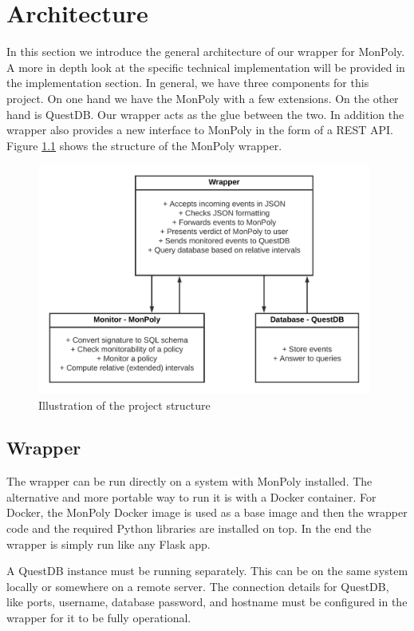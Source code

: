 \chapter{Architecture}

In this section we introduce the general architecture of our wrapper for MonPoly.
A more in depth look at the specific technical implementation will be provided in the implementation section.
In general, we have three components for this project.
On one hand we have the MonPoly with a few extensions.
On the other hand is QuestDB.
Our wrapper acts as the glue between the two.
In addition the wrapper also provides a new interface to MonPoly in the form of a REST API.
Figure \ref{fig:wrapper} shows the structure of the MonPoly wrapper.

\begin{figure}
  \centering
  \includegraphics[width=110mm]{diagrams/wrapper.png}
  \caption{Illustration of the project structure}
  \label{fig:wrapper}
\end{figure}


\section{Wrapper}

The wrapper can be run directly on a system with MonPoly installed.
The alternative and more portable way to run it is with a Docker container.
For Docker, the MonPoly Docker image is used as a base image and then the wrapper code and the required Python libraries are installed on top.
In the end the wrapper is simply run like any Flask app.

A QuestDB instance must be running separately.
This can be on the same system locally or somewhere on a remote server.
The connection details for QuestDB, like ports, username, database password, and hostname must be configured in the wrapper for it to be fully operational.

